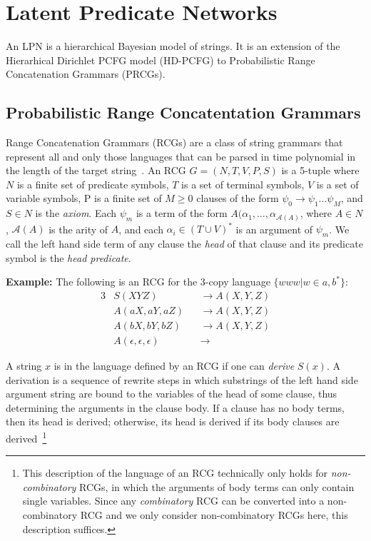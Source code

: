 \documentclass[11pt, twocolumn]{article}
\begin{document}
\section{Latent Predicate Networks}

An LPN is a hierarchical Bayesian model of strings. It is an
extension of the Hierarhical Dirichlet PCFG model (HD-PCFG) to
Probabilistic Range Concatenation Grammars (PRCGs). 

\subsection{Probabilistic Range Concatentation Grammars}
Range Concatenation Grammars (RCGs) are a class of string grammars
that represent all and only those languages that can be parsed in time
polynomial in the length of the target
string~\cite{boullier2005range}. An RCG $G=(N, T, V, P, S)$ is a
5-tuple where $N$ is a finite set of predicate symbols, $T$ is a set
of terminal symbols, $V$ is a set of variable symbols, P is a finite
set of $M \geq 0$ clauses of the form $\psi_0 \rightarrow \psi_1 \dots
\psi_M$, and $S \in N$ is the \emph{axiom}. Each $\psi_m$ is a term of
the form $A(\alpha_1, \dots, \alpha_{\mathcal{A}(A)}$, where $A \in
N$, $\mathcal{A}(A)$ is the arity of $A$, and each $\alpha_i \in (T
\cup V)^*$ is an argument of $\psi_m$. We call the left hand side term
of any clause the \emph{head} of that clause and its predicate symbol
is the \emph{head predicate}.

\textbf{Example:} The following is an RCG for the 3-copy language
$\{www | w \in {a, b}^*\}$:
\begin{alignat*}{3}
&S(XYZ) &&\rightarrow A(X, Y, Z)\\
&A(aX, aY, aZ) &&\rightarrow A(X, Y, Z)\\
&A(bX, bY, bZ) &&\rightarrow A(X, Y, Z)\\
&A(\epsilon, \epsilon, \epsilon) &&\rightarrow 
\end{alignat*}

A string $x$ is in the language defined by an RCG if one can
\emph{derive} $S(x)$. A derivation is a sequence of rewrite steps in
which substrings of the left hand side argument string are bound to
the variables of the head of some clause, thus determining the
arguments in the clause body. If a clause has no body terms, then its
head is derived; otherwise, its head is derived if its body clauses
are derived~\footnote{This description of the language of an RCG
  technically only holds for \emph{non-combinatory} RCGs, in which the
  arguments of body terms can only contain single variables. Since any
  \emph{combinatory} RCG can be converted into a non-combinatory RCG
  and we only consider non-combinatory RCGs here, this description
  suffices.}
\end{document}
